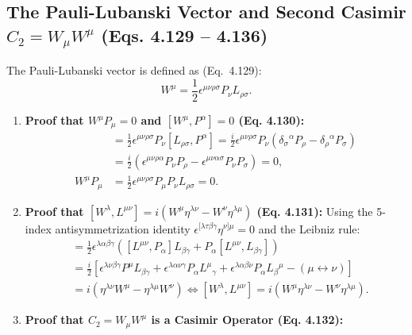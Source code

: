 \documentclass[11pt,a4paper]{article}
\begin{document}
\subsection{The Pauli-Lubanski Vector and Second Casimir $C_2 = W_\mu W^\mu$ (Eqs. 4.129 -- 4.136)}
The Pauli-Lubanski vector is defined as (Eq.~4.129):
\begin{equation}
    W^\mu = \frac{1}{2}\epsilon^{\mu\nu\rho\sigma}P_\nu L_{\rho\sigma}.
\end{equation}
\begin{enumerate}
    \item \textbf{Proof that $W^\mu P_\mu = 0$ and $[W^\mu, P^\alpha] = 0$ (Eq. 4.130):}
    \begin{align}
        [W^\mu, P^\alpha] &= \frac{1}{2}\epsilon^{\mu\nu\rho\sigma}P_\nu [L_{\rho\sigma}, P^\alpha] = \frac{i}{2}\epsilon^{\mu\nu\rho\sigma}P_\nu \left(\delta_\sigma{}^\alpha P_\rho - \delta_\rho{}^\alpha P_\sigma\right) \nonumber \\
        &= \frac{i}{2}\left(\epsilon^{\mu\nu\rho\alpha}P_\nu P_\rho - \epsilon^{\mu\nu\alpha\sigma}P_\nu P_\sigma\right) = 0, \\[4pt]
        W^\mu P_\mu &= \frac{1}{2}\epsilon^{\mu\nu\rho\sigma}P_\mu P_\nu L_{\rho\sigma} = 0.
    \end{align}
    \item \textbf{Proof that $[W^\lambda, L^{\mu\nu}] = i(W^\mu \eta^{\lambda\nu} - W^\nu \eta^{\lambda\mu})$ (Eq. 4.131):}
    Using the 5-index antisymmetrization identity $\epsilon^{[\lambda\tau\beta\gamma}\eta^{\nu]\mu} = 0$ and the Leibniz rule:
    \begin{align}
        [L^{\mu\nu}, W^\lambda] &= \frac{1}{2}\epsilon^{\lambda\alpha\beta\gamma}\left([L^{\mu\nu}, P_\alpha]L_{\beta\gamma} + P_\alpha [L^{\mu\nu}, L_{\beta\gamma}]\right) \nonumber \\
        &= \frac{i}{2}\left[\epsilon^{\lambda\nu\beta\gamma}P^\mu L_{\beta\gamma} + \epsilon^{\lambda\alpha\nu\gamma}P_\alpha L^\mu{}_\gamma + \epsilon^{\lambda\alpha\beta\nu}P_\alpha L_\beta{}^\mu - (\mu \leftrightarrow \nu)\right] \nonumber \\
        &= i\left(\eta^{\lambda\nu}W^\mu - \eta^{\lambda\mu}W^\nu\right) \iff [W^\lambda, L^{\mu\nu}] = i\left(W^\mu \eta^{\lambda\nu} - W^\nu \eta^{\lambda\mu}\right).
    \end{align}
    \item \textbf{Proof that $C_2 = W_\mu W^\mu$ is a Casimir Operator (Eq. 4.132):}
    \begin{align}

\end{align}
\end{enumerate}
\end{document}
